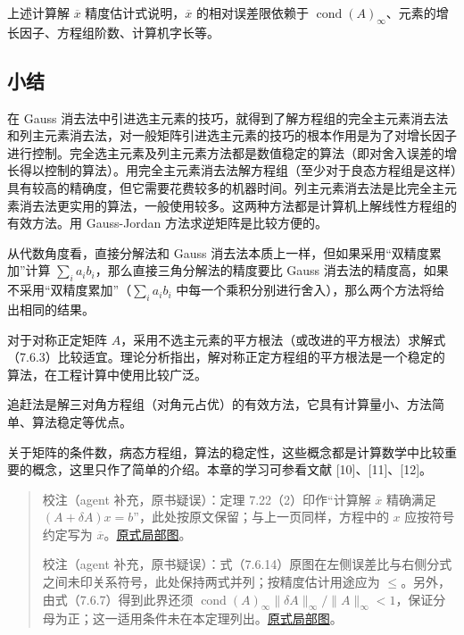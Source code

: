 上述计算解 \(\overline x\) 精度估计式说明，\(\overline x\) 的相对误差限依赖于 \(\operatorname{cond}(A)_\infty\)、元素的增长因子、方程组阶数、计算机字长等。

\subsection{小结}\label{ch07b-ux5c0fux7ed3}

在 Gauss 消去法中引进选主元素的技巧，就得到了解方程组的完全主元素消去法和列主元素消去法，对一般矩阵引进选主元素的技巧的根本作用是为了对增长因子进行控制。完全选主元素及列主元素方法都是数值稳定的算法（即对舍入误差的增长得以控制的算法）。用完全主元素消去法解方程组（至少对于良态方程组是这样）具有较高的精确度，但它需要花费较多的机器时间。列主元素消去法是比完全主元素消去法更实用的算法，一般使用较多。这两种方法都是计算机上解线性方程组的有效方法。用 Gauss-Jordan 方法求逆矩阵是比较方便的。

从代数角度看，直接分解法和 Gauss 消去法本质上一样，但如果采用``双精度累加''计算 \(\sum_i a_ib_i\)，那么直接三角分解法的精度要比 Gauss 消去法的精度高，如果不采用``双精度累加''（\(\sum_i a_ib_i\) 中每一个乘积分别进行舍入），那么两个方法将给出相同的结果。

对于对称正定矩阵 \(A\)，采用不选主元素的平方根法（或改进的平方根法）求解式（7.6.3）比较适宜。理论分析指出，解对称正定方程组的平方根法是一个稳定的算法，在工程计算中使用比较广泛。

追赶法是解三对角方程组（对角元占优）的有效方法，它具有计算量小、方法简单、算法稳定等优点。

关于矩阵的条件数，病态方程组，算法的稳定性，这些概念都是计算数学中比较重要的概念，这里只作了简单的介绍。本章的学习可参看文献 {[}10{]}、{[}11{]}、{[}12{]}。

\begin{quote}
校注（agent 补充，原书疑误）：定理 7.22（2）印作``计算解 \(\overline x\) 精确满足 \((A+\delta A)x=b\)''，此处按原文保留；与上一页同样，方程中的 \(x\) 应按符号约定写为 \(\overline x\)。\href{verified/assets/ch07b/211-computed-solution.png}{原式局部图}。

校注（agent 补充，原书疑误）：式（7.6.14）原图在左侧误差比与右侧分式之间未印关系符号，此处保持两式并列；按精度估计用途应为 \(\leqslant\)。另外，由式（7.6.7）得到此界还须 \(\operatorname{cond}(A)_\infty\|\delta A\|_\infty/\|A\|_\infty<1\)，保证分母为正；这一适用条件未在本定理列出。\href{verified/assets/ch07b/211-error-estimate.png}{原式局部图}。
\end{quote}

\clearpage

